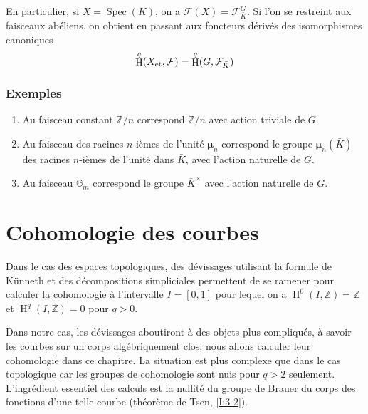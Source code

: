 \documentclass{book}
\DeclareMathOperator{\h}{H}
\DeclareMathOperator{\spec}{Spec}
\newcommand{\cF}{\mathcal{F}}
\newcommand{\dG}{\mathbb{G}}
\newcommand{\dmu}{{\bm\mu}}%
\newcommand{\dZ}{\mathbb{Z}}
\newcommand{\et}[1]{{#1}_{\textnormal{et}}}
\begin{document}
En particulier, si $X=\spec(K)$, on a $\cF(X) = \cF_{\bar K}^G$. Si l'on se 
restreint aux faisceaux abéliens, on obtient en passant aux foncteurs 
dérivés des isomorphismes canoniques 
\[
  \h^q(\et X,\cF) = \h^q(G,\cF_{\bar K})
\]





\subsubsection{Exemples}\label{I:2-4-5}

\begin{enumerate}[\indent a)]
  \item Au faisceau constant $\dZ/n$ correspond $\dZ/n$ avec action triviale de 
    $G$. 
  \item Au faisceau des racines $n$-ièmes de l'unité $\dmu_n$ correspond 
    le groupe $\dmu_n(\bar K)$ des racines $n$-ièmes de l'unité dans 
    $\bar K$, avec l'action naturelle de $G$.
  \item Au faisceau $\dG_m$ correspond le groupe $\bar K^\times$ avec l'action 
    naturelle de $G$.
\end{enumerate}




















\section{Cohomologie des courbes}\label{I:3}

Dans le cas des espaces topologiques, des dévissages utilisant la formule de 
K\"unneth et des décompositions simpliciales permettent de se ramener pour 
calculer la cohomologie à l'intervalle $I=[0,1]$ pour lequel on a 
$\h^0(I,\dZ)=\dZ$ et $\h^q(I,\dZ)=0$ pour $q>0$. 

Dans notre cas, les dévissages aboutiront à des objets plus compliqués, 
à savoir les courbes sur un corps algébriquement clos; nous allons calculer 
leur cohomologie dans ce chapitre. La situation est plus complexe que dans le 
cas topologique car les groupes de cohomologie sont nuis pour $q>2$ seulement. 
L'ingrédient essentiel des calculs est la nullité du groupe de Brauer du 
corps des fonctions d'une telle courbe (théorème de Tsen, \ref{I:3-2}). 
\end{document}

